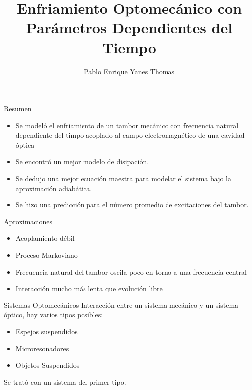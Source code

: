 \documentclass[11pt]{beamer}
\author{Pablo Enrique Yanes Thomas}
\title{Enfriamiento Optomecánico con Parámetros Dependientes del Tiempo}
\begin{document}
\begin{frame}
\titlepage
\end{frame}


\begin{frame}{Resumen}

\begin{itemize}
\item Se modeló el enfriamiento de un tambor mecánico con frecuencia natural dependiente del timpo acoplado al campo electromagnético de una cavidad óptica

\item Se encontró un mejor modelo de disipación.

\item Se dedujo una mejor ecuación maestra para modelar el sistema bajo la aproximación adiabática.

\item Se hizo una predicción para el número promedio de excitaciones del tambor.
\end{itemize}

\end{frame}

\begin{frame}{Aproximaciones}
\begin{itemize}
\item Acoplamiento débil

\item Proceso Markoviano

\item Frecuencia natural del tambor oscila poco en torno a una frecuencia central

\item Interacción mucho más lenta que evolución libre
\end{itemize}

\end{frame}

\begin{frame}{Sistemas Optomecánicos}
Interacción entre un sistema mecánico y un sistema óptico, hay varios tipos posibles:

\begin{itemize}
\item Espejos suspendidos
\item Microresonadores
\item Objetos Suspendidos
\end{itemize}

Se trató con un sistema del primer tipo.

\end{frame}
\end{document}
